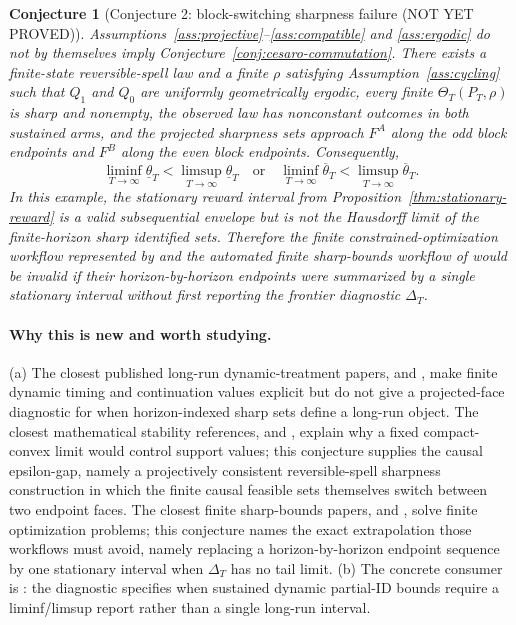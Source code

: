 \documentclass[11pt]{article}
\theoremstyle{definition}
\theoremstyle{plain}
\newtheorem{conjecture}{Conjecture}
\theoremstyle{remark}
\begin{document}
\begin{conjecture}[Conjecture 2: block-switching sharpness failure (NOT YET PROVED)]\label{conj:face-cycling}
Assumptions~\ref{ass:projective}--\ref{ass:compatible} and \ref{ass:ergodic} do not by themselves imply Conjecture~\ref{conj:cesaro-commutation}.  There exists a finite-state reversible-spell law and a finite \(\rho\) satisfying Assumption~\ref{ass:cycling} such that \(Q_1\) and \(Q_0\) are uniformly geometrically ergodic, every finite \(\Theta_T(P_T,\rho)\) is sharp and nonempty, the observed law has nonconstant outcomes in both sustained arms, and the projected sharpness sets approach \(F^A\) along the odd block endpoints and \(F^B\) along the even block endpoints.  Consequently,
\[
\liminf_{T\to\infty}\underline\theta_T
<
\limsup_{T\to\infty}\underline\theta_T
\quad\text{or}\quad
\liminf_{T\to\infty}\overline\theta_T
<
\limsup_{T\to\infty}\overline\theta_T .
\]
In this example, the stationary reward interval from Proposition~\ref{thm:stationary-reward} is a valid subsequential envelope but is not the Hausdorff limit of the finite-horizon sharp identified sets.  Therefore the finite constrained-optimization workflow represented by \citet{KalouptsidiKitamuraLimaSouzaRodrigues2020} and the automated finite sharp-bounds workflow of \citet{DuarteFinkelsteinKnoxMummoloShpitser2024} would be invalid if their horizon-by-horizon endpoints were summarized by a single stationary interval without first reporting the frontier diagnostic \(\Delta_T\).
\end{conjecture}

\paragraph{Why this is new and worth studying.}
(a) The closest published long-run dynamic-treatment papers, \citet{Han2021} and \citet{HeckmanHumphriesVeramendi2016}, make finite dynamic timing and continuation values explicit but do not give a projected-face diagnostic for when horizon-indexed sharp sets define a long-run object.  The closest mathematical stability references, \citet{Schneider1993} and \citet{RockafellarWets1998}, explain why a fixed compact-convex limit would control support values; this conjecture supplies the causal epsilon-gap, namely a projectively consistent reversible-spell sharpness construction in which the finite causal feasible sets themselves switch between two endpoint faces.  The closest finite sharp-bounds papers, \citet{DuarteFinkelsteinKnoxMummoloShpitser2024} and \citet{KalouptsidiKitamuraLimaSouzaRodrigues2020}, solve finite optimization problems; this conjecture names the exact extrapolation those workflows must avoid, namely replacing a horizon-by-horizon endpoint sequence by one stationary interval when \(\Delta_T\) has no tail limit.  (b) The concrete consumer is \citet{DiemerShiSwanson2024}: the diagnostic specifies when sustained dynamic partial-ID bounds require a liminf/limsup report rather than a single long-run interval.
\end{document}
